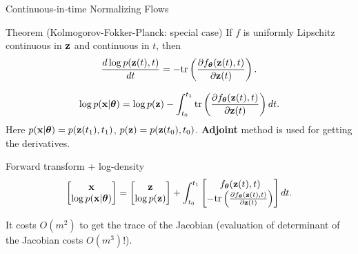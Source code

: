 \begin{frame}{Continuous-in-time Normalizing Flows}
	\vspace{-0.3cm}
	\begin{block}{Theorem (Kolmogorov-Fokker-Planck: special case)}
		If $f$ is uniformly Lipschitz continuous in $\mathbf{z}$ and continuous in $t$, then
		\[
			\frac{d \log p(\mathbf{z}(t), t)}{d t} = - \text{tr} \left( \frac{\partial f_{\boldsymbol{\theta}}(\mathbf{z}(t), t)}{\partial \mathbf{z}(t)} \right).
		\]
	\end{block}
	\vspace{-0.6cm}
	\[
		\log p(\mathbf{x} | \boldsymbol{\theta}) = \log p(\mathbf{z}) - \int_{t_0}^{t_1} \text{tr}  \left( \frac{\partial f_{\boldsymbol{\theta}}(\mathbf{z}(t), t)}{\partial \mathbf{z}(t)} \right) dt.
	\]
	Here $p(\mathbf{x} | \boldsymbol{\theta}) = p(\mathbf{z}(t_1), t_1)$, $p(\mathbf{z}) = p(\mathbf{z}(t_0), t_0)$.
	\textbf{Adjoint} method is used for getting the derivatives.
	\begin{block}{Forward transform + log-density}
		\vspace{-0.3cm}
		\[
			\begin{bmatrix}
				\mathbf{x} \\
				\log p(\mathbf{x} | \boldsymbol{\theta})
			\end{bmatrix}
			= 
			\begin{bmatrix}
				\mathbf{z} \\
				\log p(\mathbf{z})
			\end{bmatrix} + 
			\int_{t_0}^{t_1} 
			\begin{bmatrix}
				f_{\boldsymbol{\theta}}(\mathbf{z}(t), t) \\
				- \text{tr} \left( \frac{\partial f_{\boldsymbol{\theta}}(\mathbf{z}(t), t)}{\partial \mathbf{z}(t)} \right) 
			\end{bmatrix} dt.
		\]
		\vspace{-0.4cm}
	\end{block}
	It costs $O(m^2)$ to get the trace of the Jacobian (evaluation of determinant of the Jacobian costs $O(m^3)$!).
\end{frame}
